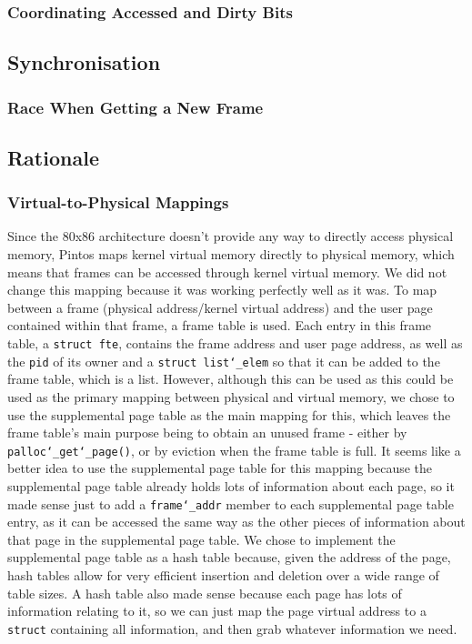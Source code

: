 \documentclass{article}
\renewcommand{\_}{\char`_}
\begin{document}
\subsubsection{Coordinating Accessed and Dirty Bits}

\subsection{Synchronisation}

\subsubsection{Race When Getting a New Frame}

\subsection{Rationale}

\subsubsection{Virtual-to-Physical Mappings}

Since the 80x86 architecture doesn't provide any way to directly access physical memory, Pintos maps kernel virtual memory directly to physical memory, which means that frames can be accessed through kernel virtual memory. We did not change this mapping because it was working perfectly well as it was. To map between a frame (physical address/kernel virtual address) and the user page contained within that frame, a frame table is used. Each entry in this frame table, a \texttt{struct fte}, contains the frame address and user page address, as well as the \texttt{pid} of its owner and a \texttt{struct list\_elem} so that it can be added to the frame table, which is a list. However, although this can be used as this could be used as the primary mapping between physical and virtual memory, we chose to use the supplemental page table as the main mapping for this, which leaves the frame table's main purpose being to obtain an unused frame - either by \texttt{palloc\_get\_page()}, or by eviction when the frame table is full. It seems like a better idea to use the supplemental page table for this mapping because the supplemental page table already holds lots of information about each page, so it made sense just to add a \texttt{frame\_addr} member to each supplemental page table entry, as it can be accessed the same way as the other pieces of information about that page in the supplemental page table. We chose to implement the supplemental page table as a hash table because, given the address of the page, hash tables allow for very efficient insertion and deletion over a wide range of table sizes. A hash table also made sense because each page has lots of information relating to it, so we can just map the page virtual address to a \texttt{struct} containing all information, and then grab whatever information we need.
\end{document}
